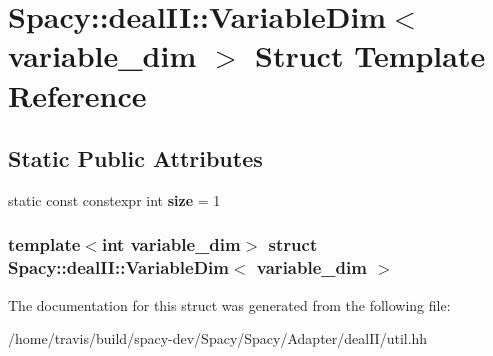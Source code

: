 \hypertarget{structSpacy_1_1dealII_1_1VariableDim_3_01variable__dim_01_4}{\section{\-Spacy\-:\-:deal\-I\-I\-:\-:\-Variable\-Dim$<$ variable\-\_\-dim $>$ \-Struct \-Template \-Reference}
\label{structSpacy_1_1dealII_1_1VariableDim_3_01variable__dim_01_4}
}
\subsection*{\-Static \-Public \-Attributes}
\begin{DoxyCompactItemize}
\item 
\hypertarget{structSpacy_1_1dealII_1_1VariableDim_3_01variable__dim_01_4_a7d09dc42b61ac31bf2b69c35535bf79c}{static const constexpr int {\bfseries size} = 1}\label{structSpacy_1_1dealII_1_1VariableDim_3_01variable__dim_01_4_a7d09dc42b61ac31bf2b69c35535bf79c}

\end{DoxyCompactItemize}
\subsubsection*{template$<$int variable\-\_\-dim$>$ struct Spacy\-::deal\-I\-I\-::\-Variable\-Dim$<$ variable\-\_\-dim $>$}



\-The documentation for this struct was generated from the following file\-:\begin{DoxyCompactItemize}
\item 
/home/travis/build/spacy-\/dev/\-Spacy/\-Spacy/\-Adapter/deal\-I\-I/util.\-hh\end{DoxyCompactItemize}
